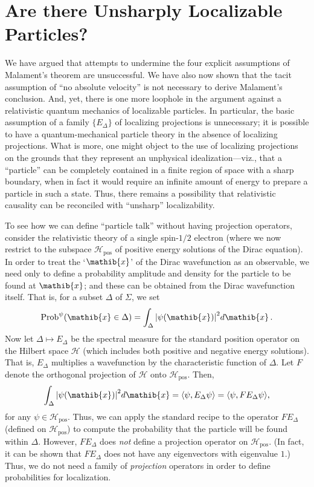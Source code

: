 \documentclass[12pt]{article}
\theoremstyle{remark}
\newcommand{\abs}[1]{\mbox{$|#1|$}}
\newcommand{\hil}[1]{\mathcal{#1}}
\begin{document}
\section{Are there Unsharply Localizable Particles?} \label{unsharp}
We have argued that attempts to undermine the four explicit
assumptions of Malament's theorem are unsuccessful.  We have also now
shown that the tacit assumption of ``no absolute velocity'' is not
necessary to derive Malament's conclusion.  And, yet, there is one
more loophole in the argument against a relativistic quantum mechanics
of localizable particles.  In particular, the basic assumption of a
family $\{ E_{\Delta} \}$ of localizing projections is unnecessary; it
is possible to have a quantum-mechanical particle theory in the
absence of localizing projections.  What is more, one might object to
the use of localizing projections on the grounds that they represent
an unphysical idealization---viz., that a ``particle'' can be
completely contained in a finite region of space with a sharp
boundary, when in fact it would require an infinite amount of energy
to prepare a particle in such a state.  Thus, there remains a
possibility that relativistic causality can be reconciled with
``unsharp'' localizability.

To see how we can define ``particle talk'' without having projection
operators, consider the relativistic theory of a single spin-$1/2$
electron (where we now restrict to the subspace
$\hil{H}_{\mathrm{pos}}$ of positive energy solutions of the Dirac
equation).  In order to treat the `$\mathib{x}$' of the Dirac
wavefunction as an observable, we need only to define a probability
amplitude and density for the particle to be found at $\mathib{x}$;
and these can be obtained from the Dirac wavefunction itself.  That
is, for a subset $\Delta$ of $\Sigma$, we set \begin{equation}
  \mathrm{Prob}^{\psi}(\mathib{x}\in \Delta)=\int _{\Delta}\abs{\psi
    (\mathib{x})}^{2}d\mathib{x} \,. \end{equation} Now let $\Delta
\mapsto E_{\Delta}$ be the spectral measure for the standard position
operator on the Hilbert space $\hil{H}$ (which includes both positive
and negative energy solutions).  That is, $E_{\Delta}$ multiplies a
wavefunction by the characteristic function of $\Delta$.  Let $F$
denote the orthogonal projection of $\hil{H}$ onto
$\hil{H}_{\mathrm{pos}}$.  Then,
\begin{equation} \int _{\Delta}\abs{\psi
    (\mathib{x})}^{2}d\mathib{x}=\langle \psi ,E_{\Delta}\psi
  \rangle =\langle \psi ,FE_{\Delta}\psi \rangle,\end{equation} 
for any $\psi \in \hil{H}_{\mathrm{pos}}$.  Thus, we can apply the standard recipe to
the operator $FE_{\Delta}$ (defined on $\hil{H}_{\mathrm{pos}}$)
to compute the probability that the particle will be found within
$\Delta$.  However, $FE_{\Delta}$ does \emph{not} define a projection operator
on $\hil{H}_{\mathrm{pos}}$.  (In fact, it can be shown that
$FE_{\Delta}$ does not have any eigenvectors with eigenvalue $1$.)
Thus, we do not need a family of \emph{projection} operators in order
to define probabilities for localization. 
\end{document}
